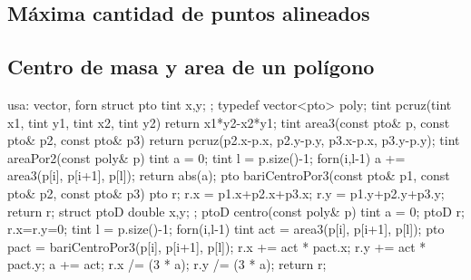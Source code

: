 \documentclass[10pt,landscape,twocolumn,a4paper,notitlepage]{article}
\begin{document}
\subsection{M\'axima cantidad de puntos alineados}
\subsection{Centro de masa y area de un pol\'igono}
\begin{code}
usa: vector, forn
struct pto { tint x,y; };
typedef vector<pto> poly;
tint pcruz(tint x1, tint y1, tint x2, tint y2) { return x1*y2-x2*y1; }
tint area3(const pto& p, const pto& p2, const pto& p3) {
  return pcruz(p2.x-p.x, p2.y-p.y, p3.x-p.x, p3.y-p.y);
}
tint areaPor2(const poly& p) {
  tint a = 0; tint l = p.size()-1;
  forn(i,l-1) a += area3(p[i], p[i+1], p[l]);
  return abs(a);
}
pto bariCentroPor3(const pto& p1, const pto& p2, const pto& p3) {
  pto r;
  r.x = p1.x+p2.x+p3.x; r.y = p1.y+p2.y+p3.y;
  return r;
}
struct ptoD { double x,y; };
ptoD centro(const poly& p) {
  tint a = 0; ptoD r; r.x=r.y=0; tint l = p.size()-1;
  forn(i,l-1) {
    tint act = area3(p[i], p[i+1], p[l]);
    pto pact = bariCentroPor3(p[i], p[i+1], p[l]);
    r.x += act * pact.x; r.y += act * pact.y; a += act;
  } r.x /= (3 * a); r.y /= (3 * a); return r;
}
\end{code}
\end{document}
